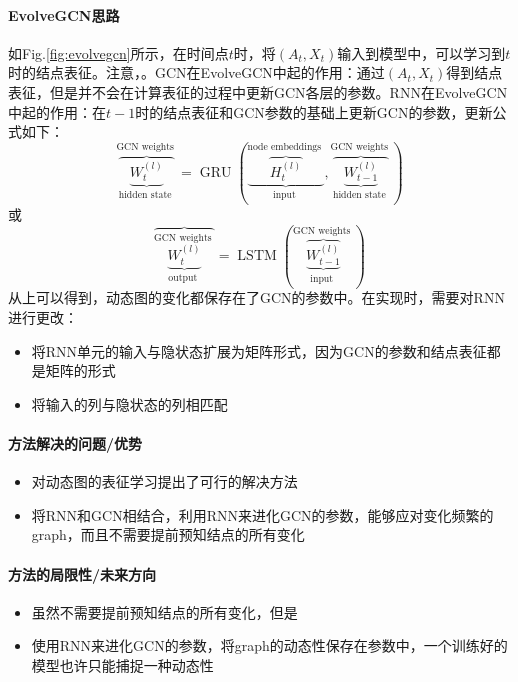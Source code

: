 \paragraph{EvolveGCN思路}
如Fig.\ref{fig:evolvegcn}所示，在时间点$t$时，将$(A_t,X_t)$输入到模型中，可以学习到$t$时的结点表征。注意，。GCN在EvolveGCN中起的作用：通过$(A_t,X_t)$得到结点表征，但是并不会在计算表征的过程中更新GCN各层的参数。RNN在EvolveGCN中起的作用：在$t-1$时的结点表征和GCN参数的基础上更新GCN的参数，更新公式如下：
$$
\overbrace{\underbrace{W_{t}^{(l)}}_{\text {hidden state }}}^{\text {GCN weights }}=\operatorname{GRU}(\underbrace{\overbrace{H_{t}^{(l)}}^{\text {node embeddings }}}_{\text {input }}, \overbrace{\underbrace{W_{t-1}^{(l)}}_{\text {hidden state }}}^{\text {GCN weights }})
$$
或
$$
\overbrace{\underbrace{W_{t}^{(l)}}^{\text {GCN weights }}}_{\text {output }}=\operatorname{LSTM}(\overbrace{\underbrace{W_{t-1}^{(l)}}_{\text {input }}}^{\text {GCN weights }})
$$
从上可以得到，动态图的变化都保存在了GCN的参数中。在实现时，需要对RNN进行更改：
\begin{itemize}
	\item 将RNN单元的输入与隐状态扩展为矩阵形式，因为GCN的参数和结点表征都是矩阵的形式
	\item 将输入的列与隐状态的列相匹配
\end{itemize}


\paragraph{方法解决的问题/优势}
\begin{itemize}

	\item 对动态图的表征学习提出了可行的解决方法
	\item 将RNN和GCN相结合，利用RNN来进化GCN的参数，能够应对变化频繁的graph，而且不需要提前预知结点的所有变化

\end{itemize}


\paragraph{方法的局限性/未来方向}

\begin{itemize}
	\item 虽然不需要提前预知结点的所有变化，但是
	\item 使用RNN来进化GCN的参数，将graph的动态性保存在参数中，一个训练好的模型也许只能捕捉一种动态性

\end{itemize}



